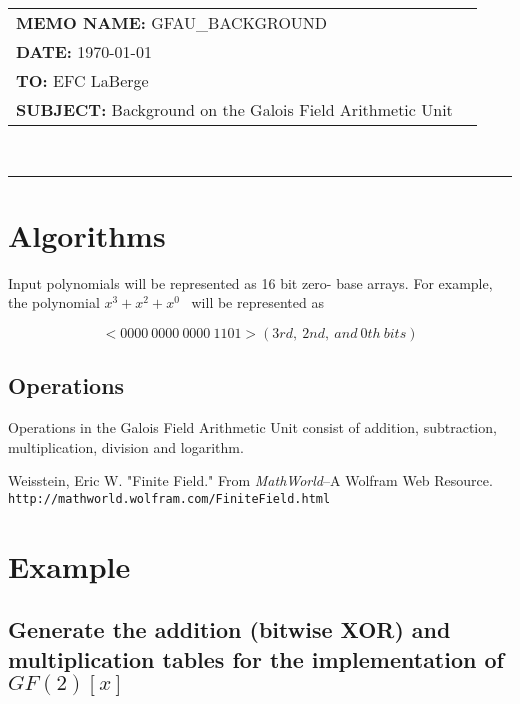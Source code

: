 \documentclass[11pt]{extarticle}
\newcommand{\examplepoly}{$x^{3}+x^{2}+x^{0}$}
\newcommand{\documentinfo}[4]{
    \begin{centering}
        \parbox{2in}{
        \begin{spacing}{1}
            \begin{flushleft}
                \begin{tabular}{l l} #1 \\ #2 \\ #3 \\ #4 \\
                \end{tabular} \\
                \rule{\textwidth}{1pt}
            \end{flushleft}
        \end{spacing} }
    \end{centering} }
\begin{document}
    \documentinfo{\textbf{MEMO NAME:} GFAU\_BACKGROUND}{\textbf{DATE:}
    \today}{\textbf{TO:} EFC LaBerge}{\textbf{SUBJECT: } Background on the
    Galois Field Arithmetic Unit}
    \vspace{-0.1in}

    

    \section{Algorithms} Input polynomials will be represented as 16 bit zero-
    base arrays. For example, the polynomial \examplepoly~ will be represented
    as

        \[ <0000 \ 0000 \ 0000 \ 1101> (3rd, \ 2nd, \ and \ 0th \ bits) \]

        

        
        \subsection{Operations} Operations in the Galois Field Arithmetic Unit
        consist of addition, subtraction, multiplication, division and
        logarithm.

        
        
        
        
        \begin{thebibliography}{9}
            Weisstein, Eric W. "Finite Field." From \textit{MathWorld}--A
            Wolfram Web Resource.
            \texttt{http://mathworld.wolfram.com/FiniteField.html}
        \end{thebibliography}

    \iffalse
    \section{Example}

        \newpage
        \subsection{Generate the addition (bitwise XOR) and multiplication
        tables for the implementation of $GF(2)[x]$}
\end{document}
